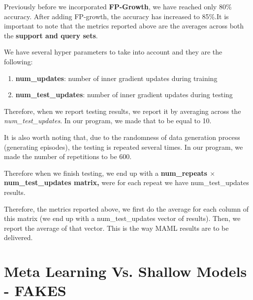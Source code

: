 \documentclass{article}
\begin{document}
Previously before we incorporated \textbf{FP-Growth}, we have reached only 80\% accuracy. After adding FP-growth, the accuracy has increased to 85\%.It is important to note that the metrics reported above are the averages across both the \textbf{support and query sets}.

We have several hyper parameters to take into account and they are the following:
\begin{enumerate}
    \item \textbf{num\_updates}: number of inner gradient updates during training
    \item \textbf{num\_test\_updates}: number of inner gradient updates during testing
\end{enumerate}
Therefore, when we report testing results, we report it by averaging across the \textit{num\_test\_updates}. In our program, we made that to be equal to 10.

\noindent It is also worth noting that, due to the randomness of data generation process (generating episodes), the testing is repeated several times. In our program, we made the number of repetitions to be 600.

\noindent Therefore when we finish testing, we end up with a \textbf{num\_repeats $\times$ num\_test\_updates matrix,} were for each repeat we have num\_test\_updates results.

\noindent Therefore, the metrics reported above, we first do the average for each column of this matrix (we end up with a  num\_test\_updates vector of results). Then, we report the average of that vector. This is the way MAML results are to be delivered.

\section{Meta Learning Vs. Shallow Models - FAKES}
\end{document}
